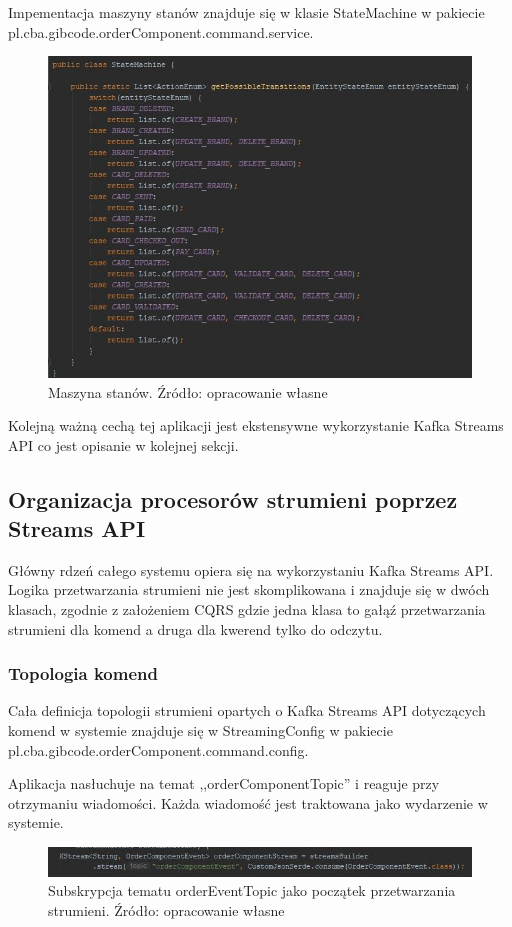 Impementacja maszyny stanów znajduje się w klasie StateMachine w pakiecie pl.cba.gibcode.orderComponent.command.service.
\begin{figure}[h!]
  \centering
    \includegraphics[width=1.0\textwidth]{images/StateMachine.JPG}
  \caption{Maszyna stanów. Źródło: opracowanie własne }
\end{figure}
\FloatBarrier

Kolejną ważną cechą tej aplikacji jest ekstensywne wykorzystanie Kafka Streams API co jest opisanie w kolejnej sekcji.

\subsection{Organizacja procesorów strumieni poprzez Streams API}
Główny rdzeń całego systemu opiera się na wykorzystaniu Kafka Streams API. 
Logika przetwarzania strumieni nie jest skomplikowana i znajduje się w dwóch klasach, zgodnie z założeniem CQRS gdzie jedna klasa to gałąź przetwarzania strumieni dla komend a druga dla kwerend tylko do odczytu.

\subsubsection{Topologia komend}
Cała definicja topologii strumieni opartych o Kafka Streams API dotyczących komend w systemie znajduje się w StreamingConfig w pakiecie pl.cba.gibcode.orderComponent.command.config. 

Aplikacja nasłuchuje na temat ,,orderComponentTopic'' i reaguje przy otrzymaniu wiadomości. Każda wiadomość jest traktowana jako wydarzenie w systemie.
\begin{figure}[h!]
  \centering
    \includegraphics[width=1.0\textwidth]{images/streamscommand1.JPG}
  \caption{Subskrypcja tematu orderEventTopic jako początek przetwarzania strumieni. Źródło: opracowanie własne }
\end{figure}
\FloatBarrier

